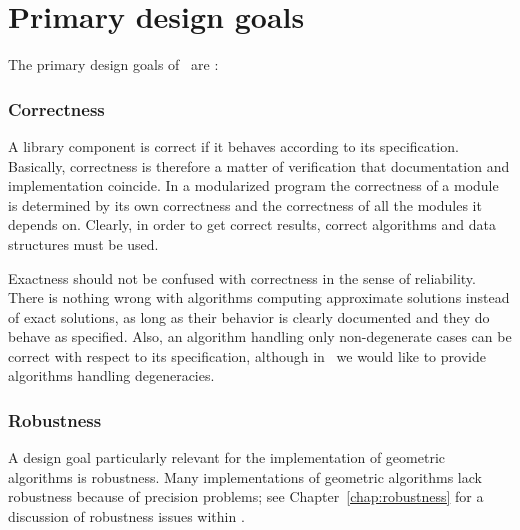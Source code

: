 
\section{Primary design goals}
\label{sec:design_goals}
The primary design goals of \cgal\ are \cite{fgkss-dccga-00}:

\subsubsection*{Correctness}
A library component is correct if it behaves according to its
specification. 
Basically, correctness is therefore a matter of 
verification that documentation and implementation coincide.
In a modularized program the correctness of a module is determined 
by its own correctness and the correctness of all the modules it depends on.  
Clearly, in order to get correct results, correct algorithms and data 
structures must be used. 

Exactness should not be confused with correctness in the sense of
reliability. There is nothing wrong with algorithms computing approximate 
solutions instead of exact solutions, as long as their 
behavior is clearly documented and they do behave as specified.
Also, an algorithm handling only non-degenerate cases can be
correct with respect to its specification, although in \cgal\ we would
like to provide algorithms handling degeneracies. 

\subsubsection*{Robustness}
A design goal particularly relevant for the implementation of
geometric algorithms is robustness.  Many implementations of geometric
algorithms lack robustness because of precision problems; see 
Chapter~\ref{chap:robustness} for a discussion of robustness issues within 
\cgal.

